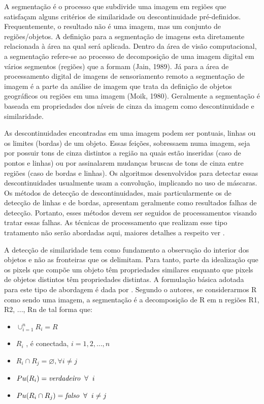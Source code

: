 \documentclass[openright]{UFRGS} %
\begin{document}
A segmentação é o processo que subdivide uma
imagem em regiões que satisfaçam alguns critérios
de similaridade ou descontinuidade pré-definidos. Frequentemente, o resultado não é uma imagem, mas um conjunto de regiões/objetos.
A definição para a segmentação de imagens esta diretamente relacionada à área na qual
será aplicada. Dentro da área de visão computacional, a segmentação refere-se ao
processo de decomposição de uma imagem digital em vários segmentos (regiões) que a
formam (Jain, 1989). Já para a área de processamento digital de imagens de
sensoriamento remoto a segmentação de imagem é a parte da análise de imagem que
trata da definição de objetos geográficos ou regiões em uma imagem (Moik, 1980). Geralmente a segmentação é baseada em propriedades
dos níveis de cinza da imagem como descontinuidade e similaridade.

As descontinuidades encontradas em uma imagem podem ser pontuais, linhas ou os
limites (bordas) de um objeto. Essas feições, sobressaem numa imagem, seja por possuir
tons de cinza distintos a região na quais estão inseridas (caso de pontos e linhas) ou por
assinalarem mudanças bruscas de tons de cinza entre regiões (caso de bordas e linhas).
Os algoritmos desenvolvidos para detectar essas descontinuidades usualmente usam a
convolução, implicando no uso de máscaras.
Os métodos de detecção de descontinuidades, mais particularmente os de detecção de
linhas e de bordas, apresentam geralmente como resultados falhas de detecção. Portanto,
esses métodos devem ser seguidos de processamentos visando tratar essas falhas. As
técnicas de processamento que realizam esse tipo tratamento não serão abordadas aqui,
maiores detalhes a respeito ver  \cite{gonzalez2010processamento}. 

A detecção de similaridade tem como fundamento a observação do interior dos objetos e
não as fronteiras que os delimitam. Para tanto, parte da idealização que os pixels que
compõe um objeto têm propriedades similares enquanto que pixels de objetos distintos
têm propriedades distintas.
A formulação básica adotada para este tipo de abordagem é dada por \cite{fu1981survey}.
Segundo o autores, se considerarmos R como sendo uma imagem, a segmentação é a
decomposição de R em n regiões R1, R2, ..., Rn de tal forma que:



\begin{itemize}
  \item $ \cup_{\textit{i}=1}^n R_{i} = R   $
  \item $ R_{i}$ , é conectada, $i =1,2,...,n $
  \item $ R_{i} \cap{} R_{j} = \varnothing, \forall i \neq j $
  \item $ Pu(R_{i})= \textit{verdadeiro} \hspace{0.2cm} \forall \hspace{0.2cm} i $
  \item $ Pu(R_{i}  \cap{}  R_{j})= \textit{falso} \hspace{0.2cm} \forall \hspace{0.2cm} i  \neq j$
\end{itemize}
\end{document}
